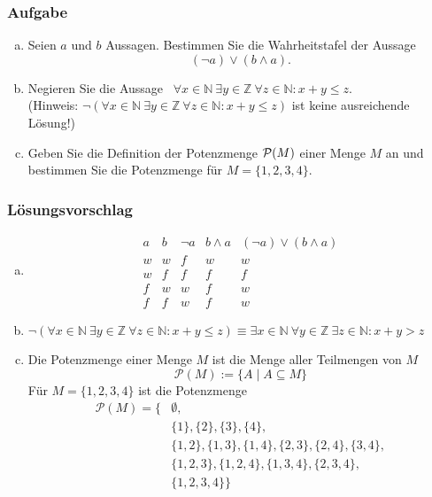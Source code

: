 \documentclass[a4paper,11pt]{scrartcl}
\newcounter{auf}
\newcommand{\Aufgabe}%
        {\addtocounter{auf}{1} \subsubsection*{\rmfamily  Aufgabe \theauf \hspace{1em}} }
\newcommand{\N}{\mathbb{N}}
\newcommand{\Z}{\mathbb{Z}}
\begin{document}
\Aufgabe

\begin{enumerate}[a)]

\item Seien $a$ und $b$  Aussagen. 
Bestimmen Sie die Wahrheitstafel der Aussage
$$
	(\neg a) \lor (b \land a).
$$
\item Negieren Sie die Aussage \ $\forall x \in \N\ \exists y \in \Z\ \forall z \in \N: x+y \le z$.\vspace{2mm}\\
(Hinweis: $\neg(\forall x \in \N\ \exists y \in \Z\ \forall z \in \N: x+y \le z)$ ist keine ausreichende Lösung!)\\
\item Geben Sie die Definition der Potenzmenge ${\cal P}(M)$ einer Menge $M$ an und bestimmen Sie die Potenzmenge für $M = \{1,2,3,4\}.$
\end{enumerate}

\subsubsection*{Lösungsvorschlag}
\begin{enumerate}[a)]

\item $$\begin{array}{c|c||c|c||c}
a&b&\neg a&b\land a&(\neg a)\lor(b\land a)\\ \hline
w&w&f&w&w\\
w&f&f&f&f\\
f&w&w&f&w\\
f&f&w&f&w
\end{array}$$
\item $\neg(\forall x \in \N\ \exists y \in \Z\ \forall z \in \N: x+y \le z) \equiv \exists x \in \N \ \forall y \in \Z\ \exists z \in \N: x+y>z$ 
\item Die Potenzmenge einer Menge $M$ ist die Menge aller Teilmengen von $M$
$$
\mathcal{P}(M):=\{A \mid A \subseteq M\}
$$
Für $M=\{1,2,3,4\}$ ist die Potenzmenge
\begin{align*}
\mathcal{P}(M)=\Big\{&\emptyset,\\
&\{1\},\{2\},\{3\},\{4\},\\
&\{1,2\},\{1,3\},\{1,4\},\{2,3\},\{2,4\},\{3,4\},\\
&\{1,2,3\},\{1,2,4\},\{1,3,4\},\{2,3,4\},\\
&\{1,2,3,4\}\Big\}
\end{align*}
\end{enumerate}
\end{document}
